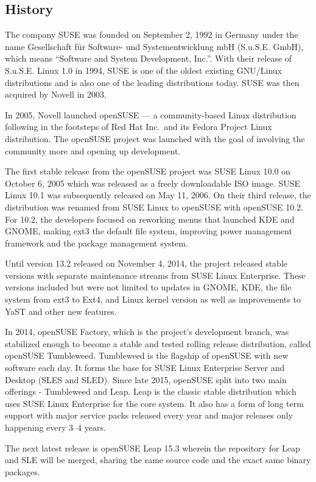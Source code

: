 \documentclass{article}
\begin{document}
\subsection{History}
The company SUSE was founded on September 2, 1992 in Germany under the name
Gesellschaft für Software- und Systementwicklung mbH (S.u.S.E. GmbH), which
means ``Software and System Development, Inc.''. With their release of S.u.S.E.
Linux 1.0 in 1994, SUSE is one of the oldest existing GNU/Linux distributions
and is also one of the leading distributions today. SUSE was then acquired by
Novell in 2003.

In 2005, Novell launched openSUSE --- a community-based Linux distribution
following in the footsteps of Red Hat Inc.\ and its Fedora Project Linux
distribution. The openSUSE project was launched with the goal of involving the
community more and opening up development.

The first stable release from the openSUSE project was SUSE Linux 10.0 on
October 6, 2005 which was released as a freely downloadable ISO image. SUSE
Linux 10.1 was subsequently released on May 11, 2006. On their third release,
the distribution was renamed from SUSE Linux to openSUSE with openSUSE 10.2. For
10.2, the developers focused on reworking menus that launched KDE and GNOME,
making ext3 the default file system, improving power management framework and
the package management system.

Until version 13.2 released on November 4, 2014, the project released stable
versions with separate maintenance streams from SUSE Linux Enterprise. These
versions included but were not limited to updates in GNOME, KDE, the file system
from ext3 to Ext4, and Linux kernel version as well as improvements to YaST and
other new features.

In 2014, openSUSE Factory, which is the project’s development branch, was
stabilized enough to become a stable and tested rolling release distribution,
called openSUSE Tumbleweed. Tumbleweed is the flagship of openSUSE with new
software each day. It forms the base for SUSE Linux Enterprise Server and
Desktop (SLES and SLED). Since late 2015, openSUSE split into two main offerings
- Tumbleweed and Leap. Leap is the classic stable distribution which uses SUSE
Linux Enterprise for the core system. It also has a form of long term support
with major service packs released every year and major releases only happening
every 3--4 years.

The next latest release is openSUSE Leap 15.3 wherein the repository for Leap
and SLE will be merged, sharing the same source code and the exact same binary
packages.
\end{document}

